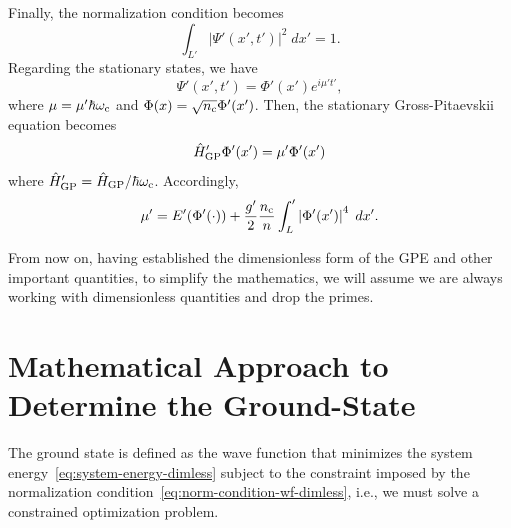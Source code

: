 \documentclass[twocolumn,showpacs,showkeys,preprintnumbers,superscriptaddress, pra, 10pt, aps]{revtex4-2}
\begin{document}
%
Finally, the normalization condition becomes
%
\begin{equation}
  \label{eq:norm-condition-wf-dimless}
  \int_{L'} \left| \Psi'(x', t') \right|^2 \; dx' = 1.
\end{equation}
%
Regarding the stationary states, we have
%
\begin{equation}
  \Psi'(x', t') = \Phi'(x') e^{i \mu' t'},
\end{equation}
%
where $\mu = \mu' \hbar \omega_{\mathrm{c}}$ and $\Phi(x) = \sqrt{n_{\mathrm{c}}} \Phi'(x')$. Then, the stationary
Gross-Pitaevskii equation becomes
%
\begin{equation}
  \label{eq:gpe-stationary-dimless}
  \hat{H}_\mathrm{GP}' \Phi'(x') = \mu' \Phi'(x')
\end{equation}
where $\hat{H}_\mathrm{GP}'=\hat{H}_\mathrm{GP}/ \hbar \omega_{\mathrm{c}} $.
%
Accordingly,
%
\begin{equation}
  \mu' = E'(\Phi'(\cdot)) + \frac{g'}{2} \frac{n_{\mathrm{c}}}{n} \int_L' \left|\Phi'(x') \right|^4 \; dx'.
\end{equation}

From now on, having established the dimensionless form of the GPE and other important quantities, to
simplify the mathematics, we will assume we are always working with dimensionless quantities and
drop the primes.

\section{Mathematical Approach to Determine the Ground-State}


The ground state is defined as the wave function that minimizes the system
energy~\eqref{eq:system-energy-dimless} subject to the constraint imposed by the normalization
condition~\eqref{eq:norm-condition-wf-dimless}, i.e., we must solve a constrained
optimization problem.

\end{document}
